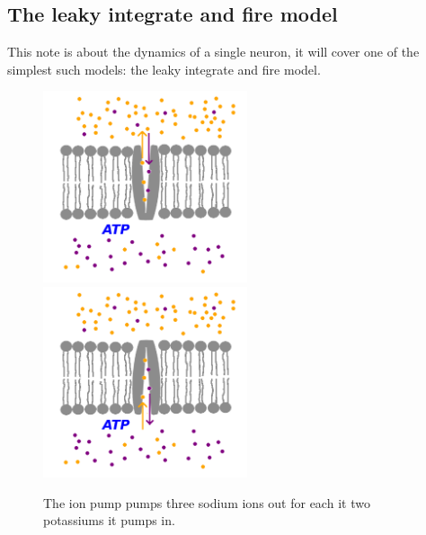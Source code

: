 \documentclass{article}
\begin{document}
\subsection*{The leaky integrate and fire model}
This note is about the dynamics of a single neuron, it will cover
one of the simplest such models: the leaky integrate and fire model.


\begin{figure}[bh]
\begin{center}
  \includegraphics[width=6cm]{ion_pump_1.png}\\
  \includegraphics[width=6cm]{ion_pump_2.png}
\end{center}
\caption{The ion pump pumps three sodium ions out for each it two potassiums it pumps in.\label{fig:ion}}
\end{figure}
\end{document}
